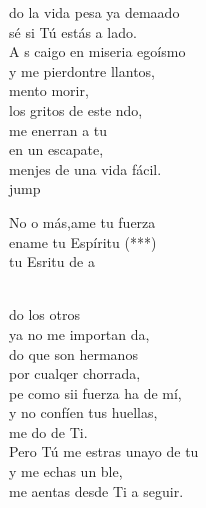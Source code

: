 \begin{cancion}%
	do la vida pesa ya demaado\\
	 sé si Tú estás a  lado.\\
	A s caigo en  miseria egoísmo\\
	y me pierdontre llantos, \\
	mento morir,\\
	los gritos de este ndo,\\
	me enerran a tu \\
	en un escapate, \\
	menjes de una vida fácil.\\jump\\
	\begin{chorus}%
	No o más,ame tu fuerza\\
	ename tu Espíritu (***) \\
	tu Esritu de a \\
	\end{chorus}%
	\jump\\
	do los otros\\
	ya no me importan da,\\
	do que son hermanos \\
	por cualqer chorrada,\\
	pe como sii fuerza ha de mí,\\
	y no confíen tus huellas,  \\
	me do de Ti.\\
	Pero Tú me estras unayo de tu\\
	y me echas un ble, \\
	me aentas desde Ti a seguir.\\
\end{cancion}%
